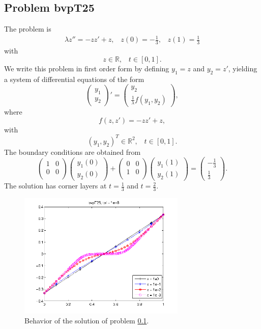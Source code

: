 \documentclass[<options>]{article}
\def \RR {{\mathbb{R}}}
\begin{document}
\subsection{Problem bvpT25}\label{test25}
The problem is 
\begin{eqnarray*}
\lambda z'' = - z z' +  z , \;\;\;z(0) = -\frac{1}{3}, \;\;\; z(1) = \frac{1}{3}
\end{eqnarray*}
with
\[
z \in \RR, \;\;\; t\in [0,1].
\]
We write this problem in first order form by defining $y_1=z$ and $y_2=z'$, yielding a system of differential equations of the form
\begin{equation*}
\left(\begin{array}{c}
y_1\\
y_2
\end{array}\right)'=
\left(\begin{array}{c}
y_2\\
\frac{1}{\lambda}f(y_1,y_2)
\end{array}\right),
\end{equation*}
where
\begin{equation*}
f(z,z') = - z z' +  z,
\end{equation*}
with
\[
(y_1,y_2)^T \in \RR^{2}, \;\;\;  t \in [0,1].
\]
The  boundary conditions are obtained from
\begin{equation*}
\left(
  \begin{array}{cc}
    1 & 0 \\
    0 & 0 \\
  \end{array}
\right)
\left(\begin{array}{c}
y_{1}(0)\\
y_{2}(0)
\end{array}\right)
+
\left(
  \begin{array}{cc}
    0 & 0 \\
    1 & 0 \\
  \end{array}
\right)
\left(\begin{array}{c}
y_{1}(1)\\
y_{2}(1)
\end{array}\right)=\left(\begin{array}{c}
-\frac{1}{3} \\
\frac{1}{3}
\end{array}\right).
\end{equation*}
The solution has corner layers at $t= \frac{1}{3}$ and $t= \frac{2}{3}.$

\begin{figure}[htb]
\centerline{\includegraphics[height=6cm]{Prob25}}
\caption{Behavior of the solution of problem \ref{test25}.}
\end{figure}
\newpage
\end{document}
